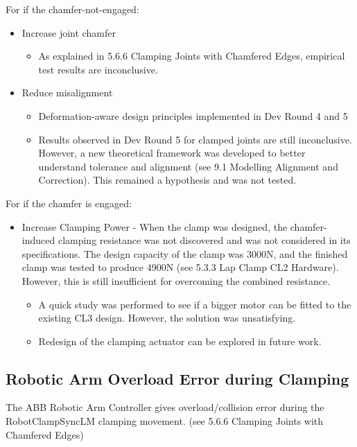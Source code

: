 For if the chamfer-not-engaged:
\begin{itemize}
    \item Increase joint chamfer
    \begin{itemize}
        \item As explained in 5.6.6 Clamping Joints with Chamfered Edges, empirical test results are inconclusive.
    \end{itemize}
    \item Reduce misalignment 
    \begin{itemize}
        \item Deformation-aware design principles implemented in Dev Round 4 and 5
        \item Results observed in Dev Round 5 for clamped joints are still inconclusive. However, a new theoretical framework was developed to better understand tolerance and alignment (see 9.1 Modelling Alignment and Correction). This remained a hypothesis and was not tested.
    \end{itemize}
\end{itemize}

For if the chamfer is engaged:
\begin{itemize}
    \item Increase Clamping Power - When the clamp was designed, the chamfer-induced clamping resistance was not discovered and was not considered in its specifications. The design capacity of the clamp was 3000N, and the finished clamp was tested to produce 4900N (see 5.3.3 Lap Clamp CL2 Hardware). However, this is still insufficient for overcoming the combined resistance.
    \begin{itemize}
        \item A quick study was performed to see if a bigger motor can be fitted to the existing CL3 design. However, the solution was unsatisfying.
        \item Redesign of the clamping actuator can be explored in future work.
    \end{itemize}
\end{itemize}

\subsection{Robotic Arm Overload Error during Clamping}
The ABB Robotic Arm Controller gives overload/collision error during the RobotClampSyncLM clamping movement. (see 5.6.6 Clamping Joints with Chamfered Edges)

